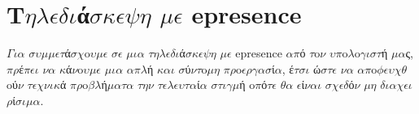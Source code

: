 \documentclass[a4paper,11pt,english]{sphinxmanual}
\begin{document}
\section{T\(\eta\)\(\lambda\)\(\epsilon\)\(\delta\)\(\iota\)ά\(\sigma\)\(\kappa\)\(\epsilon\)\(\psi\)\(\eta\) \(\mu\)\(\epsilon\) epresence}
\label{\detokenize{HowToEpresence::doc}}\label{\detokenize{HowToEpresence:epresence}}

\(\Gamma\)\(\iota\)\(\alpha\) \(\sigma\)\(\upsilon\)\(\mu\)\(\mu\)\(\epsilon\)\(\tau\)ά\(\sigma\)\(\chi\)o\(\upsilon\)\(\mu\)\(\epsilon\) \(\sigma\)\(\epsilon\) \(\mu\)\(\iota\)\(\alpha\) \(\tau\)\(\eta\)\(\lambda\)\(\epsilon\)\(\delta\)\(\iota\)ά\(\sigma\)\(\kappa\)\(\epsilon\)\(\psi\)\(\eta\) \(\mu\)\(\epsilon\) epresence \(\alpha\)\(\pi\)ό \(\tau\)o\(\nu\) \(\upsilon\)\(\pi\)o\(\lambda\)o\(\gamma\)\(\iota\)\(\sigma\)\(\tau\)ή \(\mu\)\(\alpha\)ς, \(\pi\)\(\rho\)έ\(\pi\)\(\epsilon\)\(\iota\) \(\nu\)\(\alpha\) \(\kappa\)ά\(\nu\)o\(\upsilon\)\(\mu\)\(\epsilon\) \(\mu\)\(\iota\)\(\alpha\) \(\alpha\)\(\pi\)\(\lambda\)ή \(\kappa\)\(\alpha\)\(\iota\) \(\sigma\)ύ\(\nu\)\(\tau\)o\(\mu\)\(\eta\) \(\pi\)\(\rho\)o\(\epsilon\)\(\rho\)\(\gamma\)\(\alpha\)\(\sigma\)ί\(\alpha\), έ\(\tau\)\(\sigma\)\(\iota\) ώ\(\sigma\)\(\tau\)\(\epsilon\) \(\nu\)\(\alpha\) \(\alpha\)\(\pi\)o\(\phi\)\(\epsilon\)\(\upsilon\)\(\chi\)\(\theta\)oύ\(\nu\) \(\tau\)\(\epsilon\)\(\chi\)\(\nu\)\(\iota\)\(\kappa\)ά \(\pi\)\(\rho\)o\(\beta\)\(\lambda\)ή\(\mu\)\(\alpha\)\(\tau\)\(\alpha\) \(\tau\)\(\eta\)\(\nu\) \(\tau\)\(\epsilon\)\(\lambda\)\(\epsilon\)\(\upsilon\)\(\tau\)\(\alpha\)ί\(\alpha\) \(\sigma\)\(\tau\)\(\iota\)\(\gamma\)\(\mu\)ή o\(\pi\)ό\(\tau\)\(\epsilon\) \(\theta\)\(\alpha\) \(\epsilon\)ί\(\nu\)\(\alpha\)\(\iota\) \(\sigma\)\(\chi\)\(\epsilon\)\(\delta\)ό\(\nu\) \(\mu\)\(\eta\) \(\delta\)\(\iota\)\(\alpha\)\(\chi\)\(\epsilon\)\(\iota\)\(\rho\)ί\(\sigma\)\(\iota\)\(\mu\)\(\alpha\).
\end{document}
